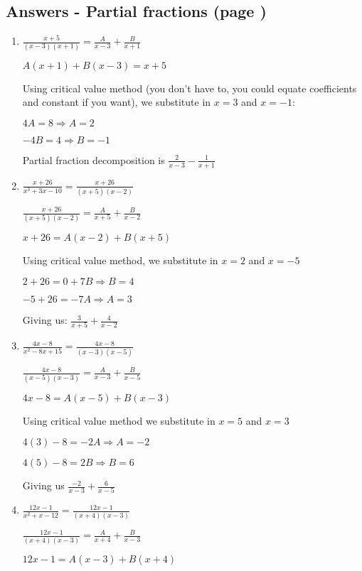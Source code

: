 \documentclass[../main.tex]{subfiles}
\begin{document}
\subsection*{Answers - Partial fractions (page \pageref{partial fractions})}
\label{Partial fractions answers}
\begin{enumerate}[itemsep=0.7cm]
    \item 
    $\frac{x+5}{(x-3)(x+1)}=\frac{A}{x-3}+\frac{B}{x+1}$

    $A(x+1)+B(x-3)=x+5$

    Using critical value method (you don't have to, you could equate coefficients and constant if you want), we substitute in $x=3$ and $x=-1$:

    $4A=8 \Rightarrow A=2$

    $-4B=4 \Rightarrow B=-1$

    Partial fraction decomposition is $\frac{2}{x-3}-\frac{1}{x+1}$

    \item 
    $\frac{x+26}{x^3+3x-10}=\frac{x+26}{(x+5)(x-2)}$

    $\frac{x+26}{(x+5)(x-2)}=\frac{A}{x+5}+\frac{B}{x-2}$

    $x+26=A(x-2)+B(x+5)$

    Using critical value method, we substitute in $x=2$ and $x=-5$

    $2+26=0+7B \Rightarrow B=4$

    $-5+26=-7A \Rightarrow A=3$

    Giving us: $\frac{3}{x+5}+\frac{4}{x-2}$

    \item 
    $\frac{4x-8}{x^2-8x+15}=\frac{4x-8}{(x-3)(x-5)}$

    $\frac{4x-8}{(x-5)(x-3)}=\frac{A}{x-3}+\frac{B}{x-5}$

    $4x-8=A(x-5)+B(x-3)$

    Using critical value method we substitute in $x=5$ and $x=3$

    $4(3)-8=-2A \Rightarrow A=-2$

    $4(5)-8=2B \Rightarrow B=6$

    Giving us $\frac{-2}{x-3}+\frac{6}{x-5}$

    \item 
    $\frac{12x-1}{x^2+x-12}=\frac{12x-1}{(x+4)(x-3)}$

    $\frac{12x-1}{(x+4)(x-3)}=\frac{A}{x+4}+\frac{B}{x-3}$

    $12x-1=A(x-3)+B(x+4)$


\end{enumerate}
\end{document}
